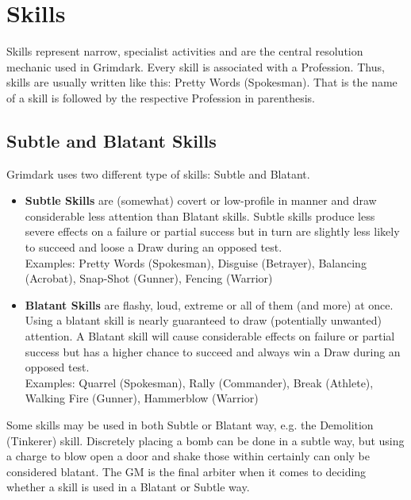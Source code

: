 
\section{Skills}%
\label{sec:skills}
Skills represent narrow, specialist activities and are the central resolution mechanic used in Grimdark. 
Every skill is associated with a Profession.
Thus, skills are usually written like this: Pretty Words (Spokesman).
That is the name of a skill is followed by the respective Profession in parenthesis.

\subsection{Subtle and Blatant Skills}
\label{skill_types}
Grimdark uses two different type of skills: Subtle and Blatant.
\begin{itemize}
	\item \textbf{Subtle Skills} are (somewhat) covert or low-profile in manner and draw considerable less attention than Blatant skills. 
	Subtle skills produce less severe effects on a failure or partial success but in turn are slightly less likely to succeed and loose a Draw during an opposed test.\\
	Examples: Pretty Words (Spokesman), Disguise (Betrayer), Balancing (Acrobat), Snap-Shot (Gunner), Fencing (Warrior)

	\item \textbf{Blatant Skills} are flashy, loud, extreme or all of them (and more) at once. 
	Using a blatant skill is nearly guaranteed to draw (potentially unwanted) attention.
	A Blatant skill will cause considerable effects on failure or partial success but has a higher chance to succeed and always win a Draw during an opposed test.\\
	Examples: Quarrel (Spokesman), Rally (Commander), Break (Athlete), Walking Fire (Gunner), Hammerblow (Warrior)
\end{itemize}
Some skills may be used in both Subtle or Blatant way, e.g. the Demolition (Tinkerer) skill. 
Discretely placing a bomb can be done in a subtle way, but using a charge to blow open a door and shake those within certainly can only be considered blatant.
The GM is the final arbiter when it comes to deciding whether a skill is used in a Blatant or Subtle way.
